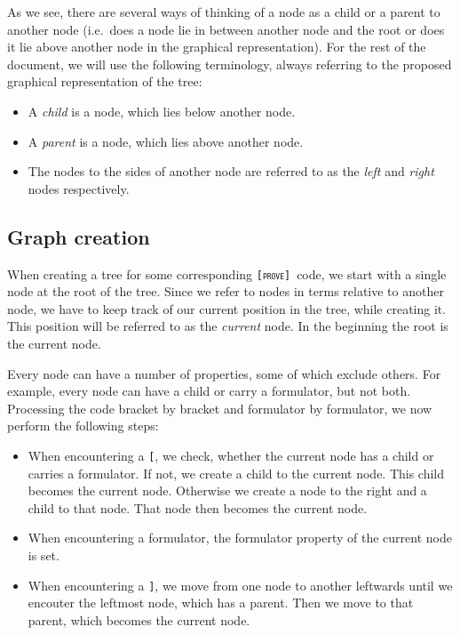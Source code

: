 \documentclass[british]{article}
\newcommand\prv{bc}
\newcommand\m[1]{\texttt{#1}}
\newcommand\name{\texttt{\textsc{[prove]}}}
\begin{document}
As we see, there are several ways of thinking of a node as a child or a parent
to another node (i.e.\ does a node lie in between another node and the root or
does it lie above another node in the graphical representation). For the rest of
the document, we will use the following terminology, always referring to the
proposed graphical representation of the tree:

\begin{itemize}
	\item
		A \emph{child} is a node, which lies below another node.
	\item
		A \emph{parent} is a node, which lies above another node.
	\item
		The nodes to the sides of another node are referred to as the
		\emph{left} and \emph{right} nodes respectively.
\end{itemize}

\subsection{Graph creation}\label{sec:creation}

When creating a tree for some corresponding \name\ code, we start with a single
node at the root of the tree. Since we refer to nodes in terms relative to
another node, we have to keep track of our current position in the tree, while
creating it. This position will be referred to as the \emph{current} node. In
the beginning the root is the current node.

Every node can have a number of properties, some of which exclude others. For
example, every node can have a child or carry a formulator, but not both. Processing
the code bracket by bracket and formulator by formulator, we now perform the following
steps:

\begin{itemize}
	\item 
		When encountering a \m{[}, we check, whether the current node has a
		child or carries a formulator. If not, we create a child to the current
		node. This child becomes the current node. Otherwise we create a
		node to the right and a child to that node. That node then becomes
		the current node.
	\item
		When encountering a formulator, the formulator property of the current node is
		set.
	\item
		When encountering a \m{]}, we move from one node to another leftwards
		until we encouter the leftmost node, which has a parent. Then we move to
		that parent, which becomes the current node.
\end{itemize}
\end{document}
